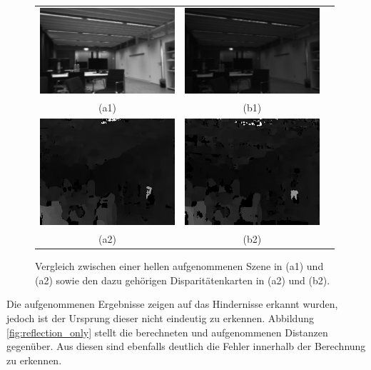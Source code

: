 \begin{figure}[h]
	\centering
	\begin{tabular}{ccc}
		\includegraphics[width=5cm]{img/brightness/bright_left} &
		\includegraphics[width=5cm]{img/brightness/middle_left} \\
		(a1) &
		(b1)\\
		\includegraphics[width=5cm]{img/brightness/bright_dis} &
		\includegraphics[width=5cm]{img/brightness/middle_dis} \\
		(a2) &
		(b2)
	\end{tabular}
	\caption{Vergleich zwischen einer hellen aufgenommenen Szene in (a1) und (a2) sowie den dazu gehörigen Disparitätenkarten in (a2) und (b2).}
	\label{fig:dark_disparity}
\end{figure}

\noindent
Die aufgenommenen Ergebnisse zeigen auf das Hindernisse erkannt wurden, jedoch ist der Ursprung dieser nicht eindeutig zu erkennen. Abbildung \ref{fig:reflection_only} stellt die berechneten und aufgenommenen Distanzen gegenüber. Aus diesen sind ebenfalls deutlich die Fehler innerhalb der Berechnung zu erkennen.

